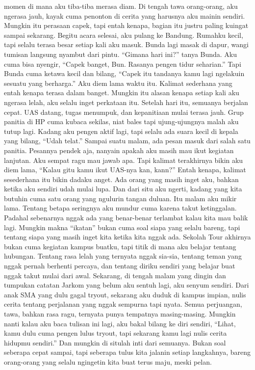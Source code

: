 \documentclass[
  letterpaper,
  DIV=11,
  numbers=noendperiod]{scrreprt}
\begin{document}
momen di mana aku tiba-tiba merasa diam. Di tengah tawa orang-orang, aku
ngerasa jauh, kayak cuma penonton di cerita yang harusnya aku mainin
sendiri. Mungkin itu perasaan capek, tapi entah kenapa, bagian itu
justru paling kuingat sampai sekarang. Begitu acara selesai, aku pulang
ke Bandung. Rumahku kecil, tapi selalu terasa besar setiap kali aku
masuk. Bunda lagi masak di dapur, wangi tumisan langsung nyambut dari
pintu. ``Gimana hari ini?'' tanya Bunda. Aku cuma bisa nyengir, ``Capek
banget, Bun. Rasanya pengen tidur seharian.'' Tapi Bunda cuma ketawa
kecil dan bilang, ``Capek itu tandanya kamu lagi ngelakuin sesuatu yang
berharga.'' Aku diem lama waktu itu. Kalimat sederhana yang entah kenapa
terasa dalam banget. Mungkin itu alasan kenapa setiap kali aku ngerasa
lelah, aku selalu inget perkataan itu. Setelah hari itu, semuanya
berjalan cepat. UAS datang, tugas menumpuk, dan kepanitiaan mulai terasa
jauh. Grup panitia di HP cuma kubaca sekilas, niat bales tapi
ujung-ujungnya malah aku tutup lagi. Kadang aku pengen aktif lagi, tapi
selalu ada suara kecil di kepala yang bilang, ``Udah telat.'' Sampai
suatu malam, ada pesan masuk dari salah satu panitia. Pesannya pendek
aja, nanyain apakah aku masih mau ikut kegiatan lanjutan. Aku sempat
ragu mau jawab apa. Tapi kalimat terakhirnya bikin aku diem lama,
``Kalau gitu kamu ikut UAS-nya kan, kann?'' Entah kenapa, kalimat
sesederhana itu bikin dadaku anget. Ada orang yang masih inget aku,
bahkan ketika aku sendiri udah mulai lupa. Dan dari situ aku ngerti,
kadang yang kita butuhin cuma satu orang yang ngulurin tangan duluan.
Itu malam aku mikir lama. Tentang betapa seringnya aku mundur cuma
karena takut ketinggalan. Padahal sebenarnya nggak ada yang benar-benar
terlambat kalau kita mau balik lagi. Mungkin makna ``ikatan'' bukan cuma
soal siapa yang selalu bareng, tapi tentang siapa yang masih inget kita
ketika kita nggak ada. Sekolah Tour akhirnya bukan cuma kegiatan kampus
buatku, tapi titik di mana aku belajar tentang hubungan. Tentang rasa
lelah yang ternyata nggak sia-sia, tentang teman yang nggak pernah
berhenti percaya, dan tentang diriku sendiri yang belajar buat nggak
takut mulai dari awal. Sekarang, di tengah malam yang dingin dan
tumpukan catatan Jarkom yang belum aku sentuh lagi, aku senyum sendiri.
Dari anak SMA yang dulu gagal tryout, sekarang aku duduk di kampus
impian, nulis cerita tentang perjalanan yang nggak sempurna tapi nyata.
Semua perjuangan, tawa, bahkan rasa ragu, ternyata punya tempatnya
masing-masing. Mungkin nanti kalau aku baca tulisan ini lagi, aku bakal
bilang ke diri sendiri, ``Lihat, kamu dulu cuma pengen lulus tryout,
tapi sekarang kamu lagi nulis cerita hidupmu sendiri.'' Dan mungkin di
situlah inti dari semuanya. Bukan soal seberapa cepat sampai, tapi
seberapa tulus kita jalanin setiap langkahnya, bareng orang-orang yang
selalu ngingetin kita buat terus maju, meski pelan.
\end{document}

